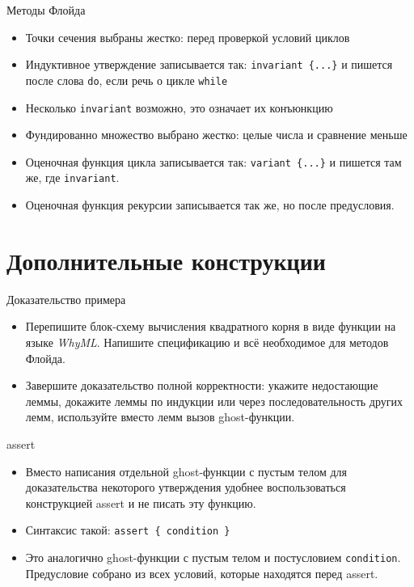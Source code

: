 \documentclass[hyperref={unicode=true}]{beamer}
\begin{document}
    \begin{frame}{Методы Флойда}
    \begin{itemize}
    \item
    Точки сечения выбраны жестко: перед проверкой
    условий циклов
    \item
    Индуктивное утверждение записывается так: \texttt{invariant \{...\}}
    и пишется после слова \texttt{do}, если речь о цикле \texttt{while}
    \item
    Несколько \texttt{invariant} возможно, это означает их конъюнкцию
    \item
    Фундированно множество выбрано жестко: целые числа и сравнение меньше
    \item
    Оценочная функция цикла записывается так: \texttt{variant \{...\}}
    и пишется там же, где \texttt{invariant}.
    \item
    Оценочная функция рекурсии записывается так же, но после предусловия.
    \end{itemize}
    \end{frame}

    \section{Дополнительные конструкции}

    \begin{frame}{Доказательство примера}
    \begin{itemize}
    \item
    Перепишите блок-схему вычисления квадратного корня в виде функции
    на языке \textsl{WhyML}. Напишите спецификацию и всё необходимое
    для методов Флойда.
    \item
    Завершите доказательство полной корректности: укажите недостающие
    леммы, докажите леммы по индукции или через последовательность
    других лемм, используйте вместо лемм вызов ghost-функции.
    \end{itemize}
    \end{frame}

    \begin{frame}{assert}
    \begin{itemize}
    \item
    Вместо написания отдельной ghost-функции с пустым телом для
    доказательства некоторого утверждения удобнее воспользоваться
    конструкцией assert и не писать эту функцию.
    \item
    Синтаксис такой: \texttt{assert \{ condition \}}
    \item
    Это аналогично ghost-функции с пустым телом и постусловием
    \texttt{condition}. Предусловие собрано из всех условий, которые
    находятся перед assert.
    \end{itemize}
    \end{frame}
\end{document}
